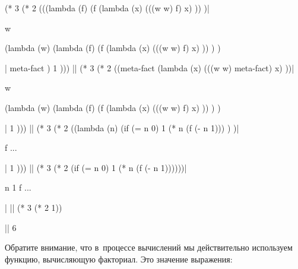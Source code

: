 \begin{code:lisp}
(* 3 (* 2 (((lambda (f)
              (f (lambda (x)
                   (((w w) f) x) )) )|\begin{where}
                                      \- w {\eq} \begin{complex}
                                                \-(lambda (w)
                                                \-  (lambda (f)
                                                \-    (f (lambda (x)
                                                \-         (((w w) f) x) )) ) )
                                                \end{complex}
                                      \end{where}|
            meta-fact )
           1 )))
|\Equals|   (* 3 (* 2 ((meta-fact (lambda (x)
                           (((w w) meta-fact) x) ))|\begin{where}
                                                    \- w {\eq} \begin{complex*}{4.5cm}
                                                              \-(lambda (w)
                                                              \-  (lambda (f)
                                                              \-    (f (lambda (x)
                                                              \-         (((w w) f) x) )) ) )
                                                              \end{complex*}
                                                    \end{where}|
              1 )))
|\Equals|   (* 3 (* 2 ((lambda (n)
                (if (= n 0) 1
                    (* n (f (- n 1))) ) )|\begin{where}
                                          \- f {\is} ...
                                          \end{where}|
              1 )))     
|\Equals|   (* 3 (* 2 (if (= n 0) 1 (* n (f (- n 1))))))|\begin{where}
                                                         \- n {\is} 1
                                                         \- f {\is} ...
                                                         \end{where}|
|\Equals|   (* 3 (* 2 1))

|\is| 6
\end{code:lisp}

Обратите внимание, что в~процессе вычислений мы действительно используем
функцию, вычисляющую факториал. Это значение выражения:

